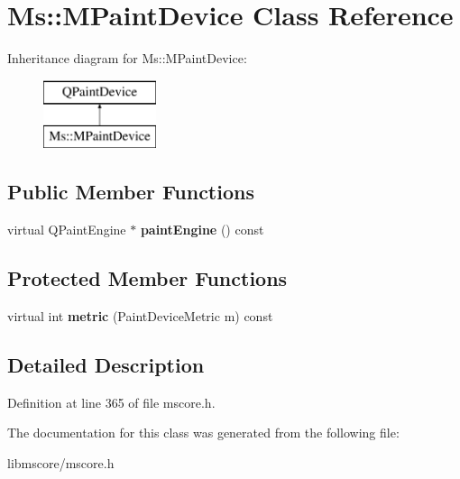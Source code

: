 \hypertarget{class_ms_1_1_m_paint_device}{}\section{Ms\+:\+:M\+Paint\+Device Class Reference}
\label{class_ms_1_1_m_paint_device}
Inheritance diagram for Ms\+:\+:M\+Paint\+Device\+:\begin{figure}[H]
\begin{center}
\leavevmode
\includegraphics[height=2.000000cm]{class_ms_1_1_m_paint_device}
\end{center}
\end{figure}
\subsection*{Public Member Functions}
\begin{DoxyCompactItemize}
\item 
\mbox{\label{class_ms_1_1_m_paint_device_ae660c442b7225b1f3c4a73c3d87d1748}} 
virtual Q\+Paint\+Engine $\ast$ {\bfseries paint\+Engine} () const
\end{DoxyCompactItemize}
\subsection*{Protected Member Functions}
\begin{DoxyCompactItemize}
\item 
\mbox{\label{class_ms_1_1_m_paint_device_a6373d7b4f6686d4bae686ee2700086f9}} 
virtual int {\bfseries metric} (Paint\+Device\+Metric m) const
\end{DoxyCompactItemize}


\subsection{Detailed Description}


Definition at line 365 of file mscore.\+h.



The documentation for this class was generated from the following file\+:\begin{DoxyCompactItemize}
\item 
libmscore/mscore.\+h\end{DoxyCompactItemize}
